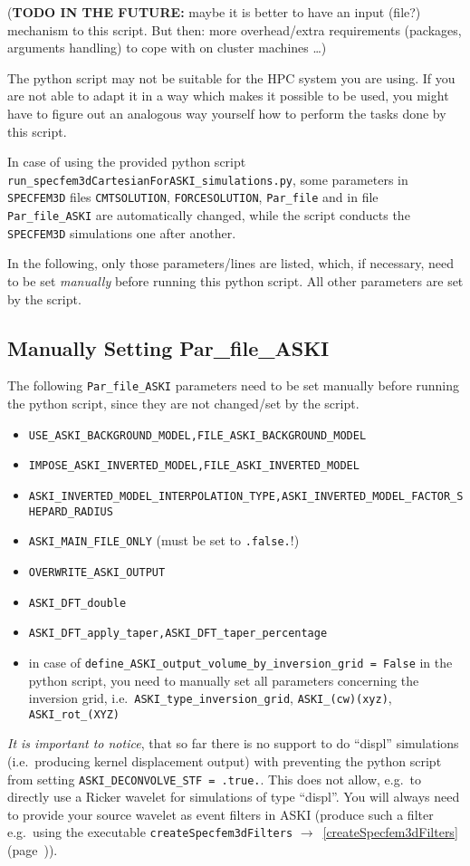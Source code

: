 \documentclass[12pt,a4paper]{article}
\newcommand{\lcode}[1]{\nolinkurl{#1}}
\newcommand{\lcodetitle}[1]{ {\ttfamily #1} }
\newcommand{\ASKI}{ {\ttfamily ASKI} }
\newcommand{\myaref}[1]{$\rightarrow$~\ref{#1} (page~\pageref{#1})}
\begin{document}
({\bf TODO IN THE FUTURE:} maybe it is better to have an input (file?) mechanism to this script. But then: more
overhead/extra requirements (packages, arguments handling) to cope with on cluster machines \dots)

The python script may not be suitable for the HPC system you are using. If you are not able to adapt 
it in a way which makes it possible to be used, you might have to figure out an analogous way yourself 
how to perform the tasks done by this script.

In case of using the provided python script \lcode{run_specfem3dCartesianForASKI_simulations.py},
some parameters in \lcode{SPECFEM3D} files \lcode{CMTSOLUTION}, \lcode{FORCESOLUTION}, \lcode{Par_file} 
and in file \lcode{Par_file_ASKI} are automatically changed, while the script conducts the
\lcode{SPECFEM3D} simulations one after another.

In the following, only those parameters/lines are listed, which, if necessary, need to be set 
\emph{manually} before running this python script. All other parameters are set by the script.

\subsection{Manually Setting \lcodetitle{Par\_file\_ASKI}}
The following \lcode{Par_file_ASKI} parameters need to be set manually before running the python script, 
since they are not changed/set by the script.
\begin{itemize}
\item \lcode{USE_ASKI_BACKGROUND_MODEL,FILE_ASKI_BACKGROUND_MODEL}
\item \lcode{IMPOSE_ASKI_INVERTED_MODEL,FILE_ASKI_INVERTED_MODEL}
\item \lcode{ASKI_INVERTED_MODEL_INTERPOLATION_TYPE,ASKI_INVERTED_MODEL_FACTOR_SHEPARD_RADIUS}
\item \lcode{ASKI_MAIN_FILE_ONLY} (must be set to \lcode{.false.}!)
\item \lcode{OVERWRITE_ASKI_OUTPUT}
\item \lcode{ASKI_DFT_double}
\item \lcode{ASKI_DFT_apply_taper,ASKI_DFT_taper_percentage}
\item in case of \lcode{define_ASKI_output_volume_by_inversion_grid = False} in the python script, 
  you need to manually set all parameters concerning the inversion grid, i.e.\ \lcode{ASKI_type_inversion_grid}, 
  \lcode{ASKI_(cw)(xyz)}, \lcode{ASKI_rot_(XYZ)}
\end{itemize}
\emph{It is important to notice}, that so far there is no support to do ``displ'' simulations (i.e.\ producing
kernel displacement output) with preventing the python script from setting \lcode{ASKI_DECONVOLVE_STF = .true.}. 
This does not allow, e.g.\ to directly use a Ricker wavelet for simulations of type ``displ''.
You will always need to provide your source wavelet as event filters in \ASKI (produce such a filter e.g.\ 
using the executable \lcode{createSpecfem3dFilters} \myaref{createSpecfem3dFilters}).
\end{document}
